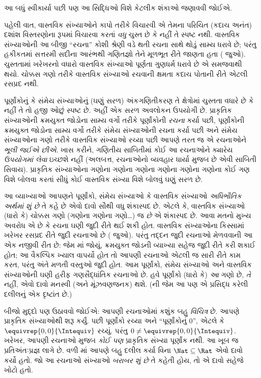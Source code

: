 આ બધું સ્વીકાર્યા પછી પણ આ સિદ્ધિઓ વિશે કેટલીક શંકાઓ જણાવવી જોઈએ.

પહેલી વાત, વાસ્તવિક સંખ્યાઓને કાપો તરીકે વિચારવી એ તેમના પરિચિત
(કદાચ અનંત) દશાંશ વિસ્તરણોના રૂપમાં વિચારવા કરતાં \emph{વધુ} ચુસ્ત
છે કે નહીં તે સ્પષ્ટ નથી. વાસ્તવિક સંખ્યાઓની આ બીજી ``રચના'' કોશી
શ્રેણી વડે થતી રચના સાથે થોડું સામ્ય ધરાવે છે; પરંતુ હકીકતમાં
સત્તરમી સદીના આરંભથી ગણિતજ્ઞો તેને મૂળભૂત રીતે જાણતા હતા
( જુઓ). ચુસ્તતામાં ખરેખરનો વધારો વાસ્તવિક સંખ્યાઓ
પૂર્ણતા ગુણધર્મ ધરાવે છે એ સમજવાથી થયો. ચોક્કસ ગણો તરીકે વાસ્તવિક
સંખ્યાઓ રચવાની ક્ષમતા કદાચ પોતાની રીતે એટલી રસપ્રદ નથી.

પૂર્ણાંકોનું કે સંમેય સંખ્યાઓનું (ઘણું સરળ) અંકગણિતીકરણ તે ક્ષેત્રોમાં
ચુસ્તતા વધારે છે કે નહીં તે તો હજી ઓછું સ્પષ્ટ છે. અહીં એક સરળ અવલોકન
ઉપયોગી છે. પ્રાકૃતિક સંખ્યાઓની ક્રમયુક્ત જોડોના સામ્ય વર્ગો તરીકે
પૂર્ણાંકોની \emph{રચના} કર્યા પછી, પૂર્ણાંકોની ક્રમયુક્ત જોડોના સામ્ય
વર્ગો તરીકે સંમેય સંખ્યાઓની રચના કર્યા પછી અને સંમેય સંખ્યાઓના ગણો
તરીકે વાસ્તવિક સંખ્યાઓ રચ્યા પછી આપણે તરત જ એ રચનાઓને \emph{ભૂલી
જઈએ છીએ}. ખાસ કરીને, ગણિતીય સાબિતીમાં કોઈ આ રચનાઓને ક્યારેય
\emph{ઉપયોગમાં લેવા} ઇચ્છશે નહીં (અલબત્ત, રચનાઓનો વ્યવહાર ધાર્યા મુજબ
છે એવી સાબિતી સિવાય). પ્રાકૃતિક સંખ્યાઓના ગણોના ગણોના ગણોના ગણોના
ગણોના ગણોના કોઈ ગણ વિશે બોલવા કરતાં સીધું કોઈ વાસ્તવિક સંખ્યા વિશે
બોલવું ઘણું સરળ છે.

આ વ્યાખ્યાઓ આપણને પૂર્ણાંકો, સંમેય સંખ્યાઓ કે વાસ્તવિક સંખ્યાઓ
\emph{અધિભૌતિક અર્થમાં શું છે} તે કહે છે એવો દાવો સૌથી વધુ
શંકાસ્પદ છે. એટલે કે, વાસ્તવિક સંખ્યાઓ (ધારો કે) ચોક્કસ ગણો
(ગણોના ગણોના ગણો\ldots) જ \emph{છે} એ શંકાસ્પદ છે. આવા મતનો મુખ્ય
અવરોધ એ છે કે રચના ઘણી જુદી રીતે થઈ શકી હોત. વાસ્તવિક સંખ્યાઓના
કિસ્સામાં ખરેખર રસપ્રદ રીતે જુદી રચનાઓ છે ( જુઓ).
પરંતુ તદ્દન જુદી રચનાઓ મેળવવાની આ એક નજીવી રીત છે: જેમ
માં જોયું, ક્રમયુક્ત જોડની વ્યાખ્યા સહેજ જુદી
રીતે કરી શકાઈ હોત; આ વૈકલ્પિક ખ્યાલ વાપર્યો હોત તો આપણી રચનાઓ એટલી
જ સારી રીતે કામ કરત, પરંતુ અંતે મળતી વસ્તુઓ જુદી હોત. આમ પૂર્ણાંકો,
સંમેય સંખ્યાઓ અને વાસ્તવિક સંખ્યાઓની ઘણી હરીફ ગણસૈદ્ધાંતિક રચનાઓ છે.
હવે પૂર્ણાંકો (ધારો કે) \emph{આ} ગણો છે, \emph{તે} નહીં, એવો દાવો
મનસ્વી (અને મૂંઝવણજનક) થશે. (ની જેમ આ પણ
\citealt{Benacerraf1965}એ પ્રસિદ્ધ કરેલી દલીલનું એક દૃષ્ટાંત છે.)

બીજો મુદ્દો પણ ઉઠાવવો જોઈએ: આપણી રચનાઓમાં કશુંક બહુ \emph{વિચિત્ર}
છે. આપણે પ્રાકૃતિક સંખ્યાઓથી શરૂ કર્યું. પછી પૂર્ણાંકો રચ્યા અને
``પૂર્ણાંકોનું $0$'', એટલે કે $\equivrep{0,0}{\Intequiv}$ રચ્યું.
પરંતુ $0 \neq \equivrep{0,0}{\Intequiv}$. ખરેખર, આપણી રચનાઓ મુજબ
\emph{કોઈ પણ} પ્રાકૃતિક સંખ્યા પૂર્ણાંક નથી. આ ખૂબ જ પ્રતિઅંતઃપ્રજ્ઞ
લાગે છે. વળી માં આપણે બહુ દલીલ કર્યા વિના
$\Nat \subseteq \Rat$ એવો દાવો કર્યો હતો. જો આ રચનાઓ સંખ્યાઓ
\emph{બરાબર શું છે} તે કહેતી હોય, તો એ દાવો સહેજે ખોટો હતો.

